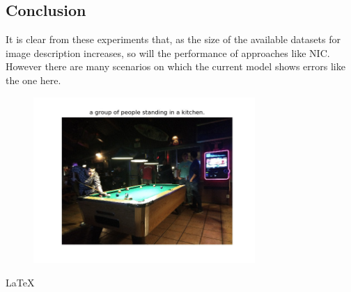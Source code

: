 \subsection{Conclusion}
It is clear from these experiments that, as the size of the available datasets for image description increases, so will the performance of approaches like NIC. However there are many scenarios on which the current model shows errors like the one here.
\begin{figure}[h!]
\includegraphics[width=0.75\textwidth]{assets/eg/err1_out.jpg}
\end{figure}


\LaTeX\
